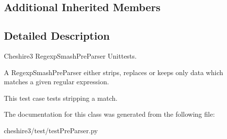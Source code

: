 \subsection*{Additional Inherited Members}


\subsection{Detailed Description}
\begin{DoxyVerb}Cheshire3 RegexpSmashPreParser Unittests.

A RegexpSmashPreParser either strips, replaces or keeps only data which 
matches a given regular expression.

This test case tests stripping a match.
\end{DoxyVerb}
 

The documentation for this class was generated from the following file\-:\begin{DoxyCompactItemize}
\item 
cheshire3/test/test\-Pre\-Parser.\-py\end{DoxyCompactItemize}
